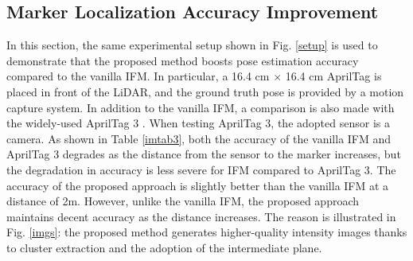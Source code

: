 \subsection{Marker Localization Accuracy Improvement}
In this section, the same experimental setup shown in Fig. \ref{setup} is used to demonstrate that the proposed method boosts pose estimation accuracy compared to the vanilla IFM. In particular, a 16.4 cm $\times$ 16.4 cm AprilTag \cite{ap3} is placed in front of the LiDAR, and the ground truth pose is provided by a motion capture system. In addition to the vanilla IFM, a comparison is also made with the widely-used AprilTag 3 \cite{ap3}. When testing AprilTag 3, the adopted sensor is a camera. As shown in Table \ref{imtab3}, both the accuracy of the vanilla IFM and AprilTag 3 degrades as the distance from the sensor to the marker increases, but the degradation in accuracy is less severe for IFM compared to AprilTag 3. The accuracy of the proposed approach is slightly better than the vanilla IFM at a distance of 2m. However, unlike the vanilla IFM, the proposed approach maintains decent accuracy as the distance increases. The reason is illustrated in Fig. \ref{imgs}: the proposed method generates higher-quality intensity images thanks to cluster extraction and the adoption of the intermediate plane.




